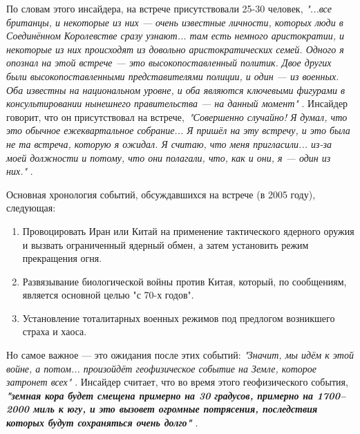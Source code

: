 \documentclass[10pt,twocolumn,letterpaper]{article}
\begin{document}
По словам этого инсайдера, на встрече присутствовали 25-30 человек, \textit{"...все британцы, и некоторые из них — очень известные личности, которых люди в Соединённом Королевстве сразу узнают... там есть немного аристократии, и некоторые из них происходят из довольно аристократических семей. Одного я опознал на этой встрече — это высокопоставленный политик. Двое других были высокопоставленными представителями полиции, и один — из военных. Оба известны на национальном уровне, и оба являются ключевыми фигурами в консультировании нынешнего правительства — на данный момент"} \cite{4}. Инсайдер говорит, что он присутствовал на встрече,\ \textit{"Совершенно случайно! Я думал, что это обычное ежеквартальное собрание... Я пришёл на эту встречу, и это была не та встреча, которую я ожидал. Я считаю, что меня пригласили... из-за моей должности и потому, что они полагали, что, как и они, я — один из них."} \cite{4}.

Основная хронология событий, обсуждавшихся на встрече (в 2005 году), следующая:

\begin{flushleft}
\begin{enumerate}
    \item Провоцировать Иран или Китай на применение тактического ядерного оружия и вызвать ограниченный ядерный обмен, а затем установить режим прекращения огня.
    \item Развязывание биологической войны против Китая, который, по сообщениям, является основной целью "с 70-х годов".
    \item Установление тоталитарных военных режимов под предлогом возникшего страха и хаоса.
\end{enumerate}
\end{flushleft}

Но самое важное — это ожидания после этих событий: \textit{"Значит, мы идём к этой войне, а потом... произойдёт геофизическое событие на Земле, которое затронет всех"} \cite{4}. Инсайдер считает, что во время этого геофизического события, \textit{\textbf{"земная кора будет смещена примерно на 30 градусов, примерно на 1700–2000 миль к югу, и это вызовет огромные потрясения, последствия которых будут сохраняться очень долго"}} \cite{4}.
\end{document}

